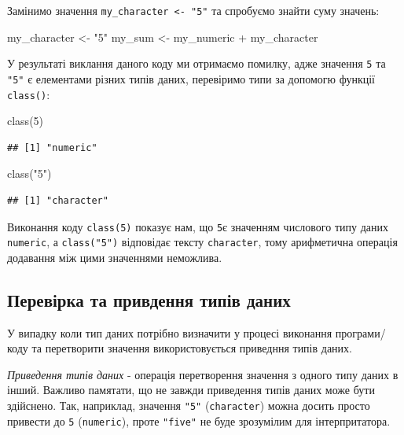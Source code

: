 \documentclass[
]{book}
\newenvironment{Shaded}{\begin{snugshade}}{\end{snugshade}}
\newcommand{\DecValTok}[1]{\textcolor[rgb]{0.00,0.00,0.81}{#1}}
\newcommand{\FunctionTok}[1]{\textcolor[rgb]{0.00,0.00,0.00}{#1}}
\newcommand{\NormalTok}[1]{#1}
\newcommand{\OtherTok}[1]{\textcolor[rgb]{0.56,0.35,0.01}{#1}}
\newcommand{\SpecialCharTok}[1]{\textcolor[rgb]{0.00,0.00,0.00}{#1}}
\newcommand{\StringTok}[1]{\textcolor[rgb]{0.31,0.60,0.02}{#1}}
\begin{document}
Замінимо значення \texttt{my\_character\ \textless{}-\ "5"} та спробуємо знайти суму значень:

\begin{Shaded}
\begin{Highlighting}[]
\NormalTok{my\_character }\OtherTok{\textless{}{-}} \StringTok{"5"}
\NormalTok{my\_sum }\OtherTok{\textless{}{-}}\NormalTok{ my\_numeric }\SpecialCharTok{+}\NormalTok{ my\_character}
\end{Highlighting}
\end{Shaded}

У результаті виклання даного коду ми отримаємо помилку, адже значення \texttt{5} та \texttt{"5"} є елементами різних типів даних, перевіримо типи за допомогю функції \texttt{class()}:

\begin{Shaded}
\begin{Highlighting}[]
\FunctionTok{class}\NormalTok{(}\DecValTok{5}\NormalTok{)}
\end{Highlighting}
\end{Shaded}

\begin{verbatim}
## [1] "numeric"
\end{verbatim}

\begin{Shaded}
\begin{Highlighting}[]
\FunctionTok{class}\NormalTok{(}\StringTok{"5"}\NormalTok{)}
\end{Highlighting}
\end{Shaded}

\begin{verbatim}
## [1] "character"
\end{verbatim}

Виконання коду \texttt{class(5)} показує нам, що \texttt{5}є значенням числового типу даних \texttt{numeric}, а \texttt{class("5")} відповідає тексту \texttt{character}, тому арифметична операція додавання між цими значеннями неможлива.

\hypertarget{chapter222}{%
\subsection{Перевірка та привдення типів даних}\label{chapter222}}

У випадку коли тип даних потрібно визначити у процесі виконання програми/коду та перетворити значення використовується приведння типів даних.

\emph{Приведення типів даних} - операція перетворення значення з одного типу даних в інший. Важливо памятати, що не завжди приведення типів даних може бути здійснено. Так, наприклад, значення \texttt{"5"} (\texttt{character}) можна досить просто привести до \texttt{5} (\texttt{numeric}), проте \texttt{"five"} не буде зрозумілим для інтерпритатора.
\end{document}
